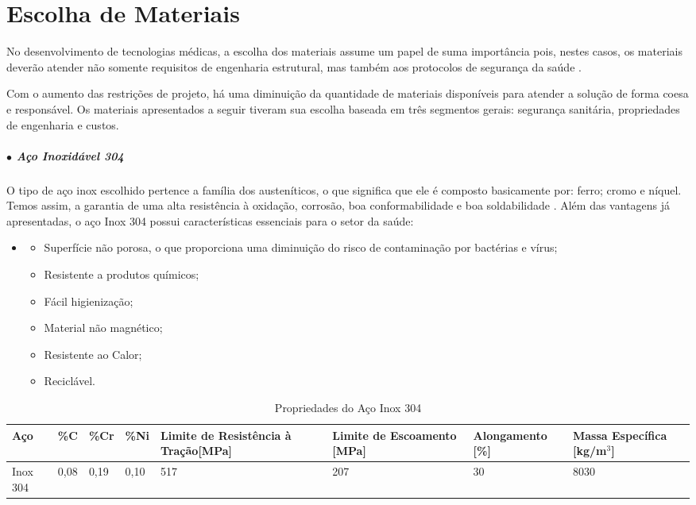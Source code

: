 \section{Escolha de Materiais}
No desenvolvimento de tecnologias médicas, a escolha dos materiais assume um papel de suma importância pois, nestes casos, os materiais deverão atender não somente requisitos de engenharia estrutural, mas também aos protocolos de segurança da saúde \cite{Steel_Group}.

Com o aumento das restrições de projeto, há uma diminuição da quantidade de materiais disponíveis para atender a solução de forma coesa e responsável. Os materiais apresentados a seguir tiveram sua escolha baseada em três segmentos gerais: segurança sanitária, propriedades de engenharia e custos.

\subparagraph*{$\bullet$ Aço Inoxidável 304} \hfill

O tipo de aço inox escolhido pertence a família dos austeníticos, o que significa que ele é composto basicamente por: ferro; cromo e níquel. Temos assim, a garantia de uma alta resistência à oxidação, corrosão, boa conformabilidade e boa soldabilidade \cite{Askeland_Wright_2019}. Além das vantagens já apresentadas, o aço Inox 304 possui características essenciais para o setor da saúde:
\begin{itemize}
    \item []
    \begin{itemize}
        \item Superfície não porosa, o que proporciona uma diminuição do risco de contaminação por bactérias e vírus;
        \item Resistente a produtos químicos;
        \item Fácil higienização;
        \item Material não magnético; 
        \item Resistente ao Calor;
        \item Reciclável.
    \end{itemize}
\end{itemize}
    

\begin{table}[H]
    \centering
    \caption{Propriedades do Aço Inox 304 \cite{Askeland_Wright_2019}}
    \label{fig:PropAI}
    \begin{adjustbox}{max width = 1\textwidth}
        \begin{tabular}{|C{1.5cm}|C{1.5cm}|C{1.5cm}|C{1.5cm}|C{3cm}|C{3cm}|C{2.8cm}|C{3cm}|}
            \hline
            \textbf{Aço} & \textbf{\%C} & \textbf{\%Cr} & \textbf{\%Ni} & \textbf{Limite de Resistência à Tração[MPa]} & \textbf{Limite de Escoamento [MPa]} & \textbf{Alongamento [\%]} & \textbf{Massa Específica [kg/m$^3$]}  \\ \hline
            
              Inox 304 & 0,08 & 0,19 & 0,10  & 517 & 207 & 30 & 8030              \\ \hline
            
        \end{tabular}
    \end{adjustbox}
\end{table}

